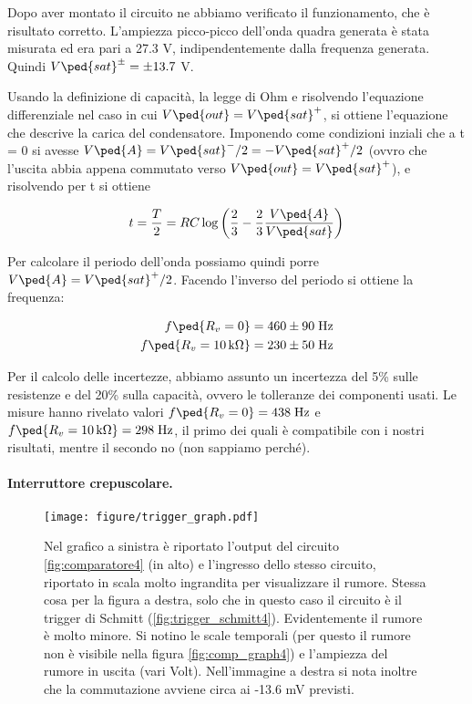 Dopo aver montato il circuito ne abbiamo verificato il funzionamento, che è risultato corretto. L'ampiezza picco-picco dell'onda quadra generata
è stata misurata ed era pari a 27.3 V, indipendentemente dalla frequenza generata. Quindi $V\ped{sat}^{\pm} = \pm 13.7$ V.

Usando la definizione di capacità, la legge di Ohm e risolvendo l'equazione differenziale nel caso in cui $V\ped{out} = V\ped{sat}^+$,
si ottiene l'equazione che descrive la carica del condensatore. Imponendo come condizioni inziali che a t = 0 si avesse $V\ped{A} = V\ped{sat}^-/2 = -V\ped{sat}^+/2$
(ovvro che l'uscita abbia appena commutato verso $V\ped{out} = V\ped{sat}^+$),
e risolvendo per t si ottiene

\begin{equation}
    t = \frac{T}{2} = RC\log\left(\frac{2}{3} - \frac{2}{3}\frac{V\ped{A}}{V\ped{sat}}\right)
\end{equation}

Per calcolare il periodo dell'onda possiamo quindi porre $V\ped{A} = V\ped{sat}^+/2$. Facendo l'inverso del periodo si ottiene la frequenza:

\begin{eqnarray}
    f\ped{R_v = 0} = 460 \pm 90 \; \si{\hertz} \\ f\ped{R_v = \SI{10}{\kilo\ohm}} = 230 \pm 50 \; \si{\hertz}
\end{eqnarray}

Per il calcolo delle incertezze, abbiamo assunto un incertezza del 5\% sulle resistenze e del 20\% sulla capacità,
ovvero le tolleranze dei componenti usati. Le misure hanno rivelato valori $f\ped{R_v = 0} = 438 \; \si{\hertz}$
e $f\ped{R_v = \SI{10}{\kilo\ohm}} = 298 \; \si{\hertz}$, il primo dei quali è compatibile con i nostri risultati, mentre il secondo no
(non sappiamo perché).

\paragraph{Interruttore crepuscolare.}

\begin{figure*}
    \texttt{[image: figure/trigger\_graph.pdf]}
    \caption{Nel grafico a sinistra è riportato l'output del circuito \ref{fig:comparatore4} (in alto) e l'ingresso dello stesso circuito,
        riportato in scala molto ingrandita per visualizzare il rumore. Stessa cosa per la figura a destra, solo che in questo caso
        il circuito è il trigger di Schmitt (\ref{fig:trigger_schmitt4}). Evidentemente il rumore è molto minore. Si notino le scale temporali
        (per questo il rumore non è visibile nella figura \ref{fig:comp_graph4}) e l'ampiezza del rumore in uscita (vari Volt). Nell'immagine a destra
    si nota inoltre che la commutazione avviene circa ai -13.6 mV previsti.}
	\label{fig:rumore4}
\end{figure*}

